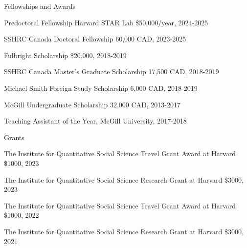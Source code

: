 \documentclass{resume}
\begin{document}
\bigskip



\begin{rSection}{\Large F\MakeLowercase{ellowships and}  A\MakeLowercase{wards}} \itemsep -2pt
\vspace{-0.7cm}
\item Predoctoral Fellowship Harvard STAR Lab \$50,000/year, 2024-2025
\item SSHRC Canada Doctoral Fellowship 60,000 CAD, 2023-2025 
\item Fulbright Scholarship \$20,000, 2018-2019
\item SSHRC Canada Master's Graduate Scholarship 17,500 CAD, 2018-2019 
\item Michael Smith Foreign Study Scholarship 6,000 CAD, 2018-2019
\item McGill Undergraduate Scholarship 32,000 CAD, 2013-2017
\item Teaching Assistant of the Year, McGill University, 2017-2018
\end{rSection}

\bigskip


\begin{rSection}{\Large G\MakeLowercase{rants}} \itemsep -2pt
\vspace{-0.7cm}
\item The Institute for Quantitative Social Science Travel Grant Award at Harvard \$1000, 2023
\item The Institute for Quantitative Social Science Research Grant at Harvard \$3000, 2023
\item The Institute for Quantitative Social Science Travel Grant Award at Harvard \$1000, 2022
\item The Institute for Quantitative Social Science Research Grant at Harvard \$3000, 2021
\end{rSection}


\newpage
\end{document}
